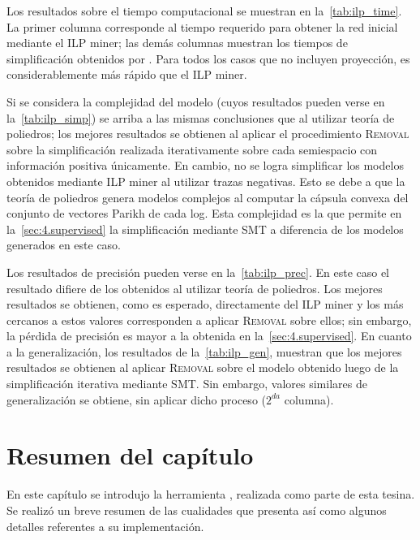 Los resultados sobre el tiempo computacional se muestran en la~\autoref{tab:ilp_time}.
La primer columna corresponde al tiempo requerido para obtener la red inicial mediante el ILP miner; las demás columnas muestran
los tiempos de simplificación obtenidos por \pachtool. Para todos los casos que no incluyen proyección, \pachtool
es considerablemente más rápido que el ILP miner. %

Si se considera la complejidad del modelo (cuyos resultados pueden verse en la~\autoref{tab:ilp_simp}) se arriba a las mismas
conclusiones que al utilizar teoría de poliedros; los mejores resultados se obtienen
al aplicar el  procedimiento \textsc{Removal} sobre la simplificación realizada iterativamente sobre cada semiespacio
con información positiva únicamente. En cambio, no se logra simplificar
los modelos obtenidos mediante ILP miner al utilizar trazas negativas. Esto se debe a que la teoría de poliedros
genera modelos complejos al computar la cápsula convexa del conjunto de vectores Parikh de cada log. Esta
complejidad es la que permite en la~\autoref{sec:4.supervised} la simplificación mediante SMT a diferencia
de los modelos generados en este caso.




Los resultados de precisión pueden verse en la~\autoref{tab:ilp_prec}. En este caso el resultado difiere de los obtenidos
al utilizar teoría de poliedros. Los mejores resultados se obtienen, como es esperado, directamente del ILP miner y los más cercanos
a estos valores corresponden a aplicar \textsc{Removal} sobre ellos; sin embargo, la pérdida de precisión es mayor a la obtenida
en la~\autoref{sec:4.supervised}.
En cuanto a la generalización, los resultados de la~\autoref{tab:ilp_gen}, muestran que los mejores resultados se obtienen
al aplicar \textsc{Removal} sobre el modelo obtenido luego de la simplificación iterativa mediante SMT. Sin embargo, 
valores similares de generalización se obtiene, sin aplicar dicho proceso ($2^{da}$ columna).




\section{Resumen del capítulo}
\label{sec:4.resumen}

En este capítulo se introdujo la herramienta \pachtool, realizada como parte de esta tesina. Se realizó un breve
resumen de las cualidades que presenta así como algunos detalles referentes a su implementación.

